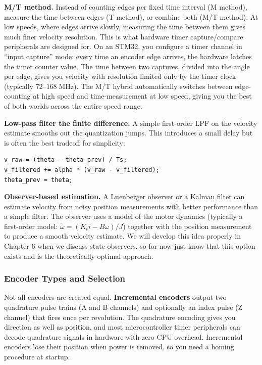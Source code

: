 \textbf{M/T method.} Instead of counting edges per fixed time interval (M method), measure the time between edges (T method), or combine both (M/T method). At low speeds, where edges arrive slowly, measuring the time between them gives much finer velocity resolution. This is what hardware timer capture/compare peripherals are designed for. On an STM32, you configure a timer channel in ``input capture'' mode: every time an encoder edge arrives, the hardware latches the timer counter value. The time between two captures, divided into the angle per edge, gives you velocity with resolution limited only by the timer clock (typically $72$--$168\;\mathrm{MHz}$). The M/T hybrid automatically switches between edge-counting at high speed and time-measurement at low speed, giving you the best of both worlds across the entire speed range.

\textbf{Low-pass filter the finite difference.} A simple first-order LPF on the velocity estimate smooths out the quantization jumps. This introduces a small delay but is often the best tradeoff for simplicity:

\begin{verbatim}
v_raw = (theta - theta_prev) / Ts;
v_filtered += alpha * (v_raw - v_filtered);
theta_prev = theta;
\end{verbatim}

\textbf{Observer-based estimation.} A Luenberger observer or a Kalman filter can estimate velocity from noisy position measurements with better performance than a simple filter. The observer uses a model of the motor dynamics (typically a first-order model: $\dot{\omega} = (K_t i - B\omega) / J$) together with the position measurement to produce a smooth velocity estimate. We will develop this idea properly in Chapter 6 when we discuss state observers, so for now just know that this option exists and is the theoretically optimal approach.

\subsubsection{Encoder Types and Selection}

Not all encoders are created equal. \textbf{Incremental encoders} output two quadrature pulse trains (A and B channels) and optionally an index pulse (Z channel) that fires once per revolution. The quadrature encoding gives you direction as well as position, and most microcontroller timer peripherals can decode quadrature signals in hardware with zero CPU overhead. Incremental encoders lose their position when power is removed, so you need a homing procedure at startup.

